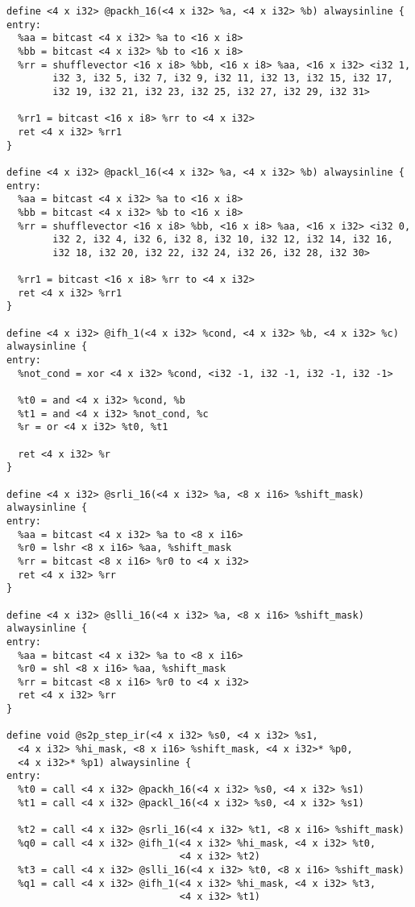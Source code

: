 \begin{lstlisting}
define <4 x i32> @packh_16(<4 x i32> %a, <4 x i32> %b) alwaysinline {
entry:
  %aa = bitcast <4 x i32> %a to <16 x i8>
  %bb = bitcast <4 x i32> %b to <16 x i8>
  %rr = shufflevector <16 x i8> %bb, <16 x i8> %aa, <16 x i32> <i32 1,
        i32 3, i32 5, i32 7, i32 9, i32 11, i32 13, i32 15, i32 17,
        i32 19, i32 21, i32 23, i32 25, i32 27, i32 29, i32 31>

  %rr1 = bitcast <16 x i8> %rr to <4 x i32>
  ret <4 x i32> %rr1
}

define <4 x i32> @packl_16(<4 x i32> %a, <4 x i32> %b) alwaysinline {
entry:
  %aa = bitcast <4 x i32> %a to <16 x i8>
  %bb = bitcast <4 x i32> %b to <16 x i8>
  %rr = shufflevector <16 x i8> %bb, <16 x i8> %aa, <16 x i32> <i32 0,
        i32 2, i32 4, i32 6, i32 8, i32 10, i32 12, i32 14, i32 16,
        i32 18, i32 20, i32 22, i32 24, i32 26, i32 28, i32 30>

  %rr1 = bitcast <16 x i8> %rr to <4 x i32>
  ret <4 x i32> %rr1
}

define <4 x i32> @ifh_1(<4 x i32> %cond, <4 x i32> %b, <4 x i32> %c)
alwaysinline {
entry:
  %not_cond = xor <4 x i32> %cond, <i32 -1, i32 -1, i32 -1, i32 -1>

  %t0 = and <4 x i32> %cond, %b
  %t1 = and <4 x i32> %not_cond, %c
  %r = or <4 x i32> %t0, %t1

  ret <4 x i32> %r
}

define <4 x i32> @srli_16(<4 x i32> %a, <8 x i16> %shift_mask)
alwaysinline {
entry:
  %aa = bitcast <4 x i32> %a to <8 x i16>
  %r0 = lshr <8 x i16> %aa, %shift_mask
  %rr = bitcast <8 x i16> %r0 to <4 x i32>
  ret <4 x i32> %rr
}

define <4 x i32> @slli_16(<4 x i32> %a, <8 x i16> %shift_mask)
alwaysinline {
entry:
  %aa = bitcast <4 x i32> %a to <8 x i16>
  %r0 = shl <8 x i16> %aa, %shift_mask
  %rr = bitcast <8 x i16> %r0 to <4 x i32>
  ret <4 x i32> %rr
}

define void @s2p_step_ir(<4 x i32> %s0, <4 x i32> %s1,
  <4 x i32> %hi_mask, <8 x i16> %shift_mask, <4 x i32>* %p0,
  <4 x i32>* %p1) alwaysinline {
entry:
  %t0 = call <4 x i32> @packh_16(<4 x i32> %s0, <4 x i32> %s1)
  %t1 = call <4 x i32> @packl_16(<4 x i32> %s0, <4 x i32> %s1)

  %t2 = call <4 x i32> @srli_16(<4 x i32> %t1, <8 x i16> %shift_mask)
  %q0 = call <4 x i32> @ifh_1(<4 x i32> %hi_mask, <4 x i32> %t0,
                              <4 x i32> %t2)
  %t3 = call <4 x i32> @slli_16(<4 x i32> %t0, <8 x i16> %shift_mask)
  %q1 = call <4 x i32> @ifh_1(<4 x i32> %hi_mask, <4 x i32> %t3,
                              <4 x i32> %t1)


\end{lstlisting}
